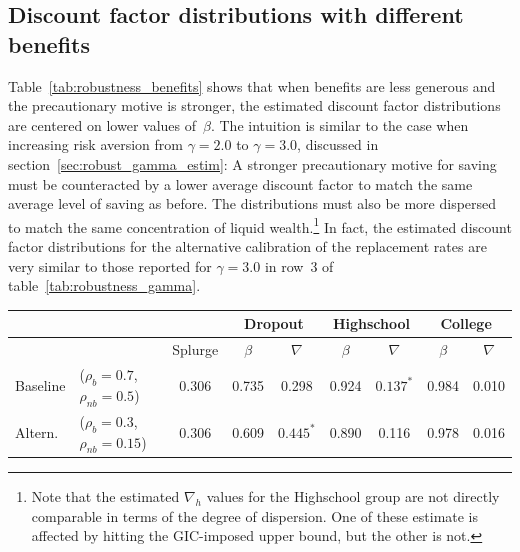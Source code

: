\documentclass{econsocart}
\begin{document}
\subsection*{Discount factor distributions with different benefits}
\whenintegrated{\label{sec:robust_benefits_estim}} %

Table~\ref{tab:robustness_benefits} shows that when benefits are less generous and the precautionary motive is stronger, the estimated discount factor distributions are centered on lower values of~$\beta$.
The intuition is similar to the case when increasing risk aversion from $\gamma=2.0$ to $\gamma=3.0$, discussed in section~\ref{sec:robust_gamma_estim}: A stronger precautionary motive for saving must be counteracted by a lower average discount factor to match the same average level of saving as before.
The distributions must also be more dispersed to match the same concentration of liquid wealth.\footnote{Note that the estimated $\nabla_h$ values for the Highschool group are not directly comparable in terms of the degree of dispersion.
  One of these estimate is affected by hitting the GIC-imposed upper bound, but the other is not.} In fact, the estimated discount factor distributions for the alternative calibration of the replacement rates are very similar to those reported for $\gamma=3.0$ in row~3 of table~\ref{tab:robustness_gamma}.

\begin{center}
  \small
  \begin{tabular}
    {@{}llc|cccccc@{}}
    \toprule
             &                                            &         & \multicolumn{2}{c}{Dropout} & \multicolumn{2}{c}{Highschool} & \multicolumn{2}{c}{College}                                    \\ \midrule
             &                                            & Splurge & $\beta$                     & $\nabla$                        & $\beta$                     & $\nabla$    & $\beta$ & $\nabla$ \\ \midrule
    Baseline & ($\rho_{b}\!=\!0.7$, $\rho_{nb}\!=\!0.5$)  & 0.306   & 0.735                       & 0.298                           & 0.924                       & $0.137^{*}$ & 0.984   & 0.010    \\
    Altern.  & ($\rho_{b}\!=\!0.3$, $\rho_{nb}\!=\!0.15$) & 0.306   & 0.609                       & $0.445^{*}$                     & 0.890                       & 0.116       & 0.978   & 0.016
    \\ \bottomrule
  \end{tabular}
\end{center}
\label{tab:robustness_benefits}
\end{document}
